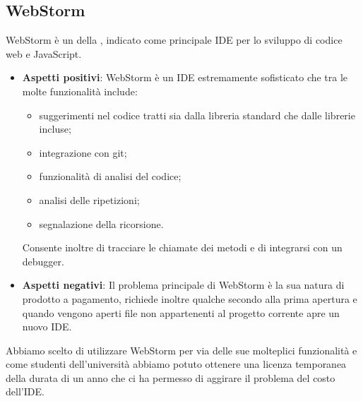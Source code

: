 \subsection{WebStorm}
WebStorm è un  della , indicato come principale IDE per lo sviluppo di codice web e JavaScript.
\begin{itemize}
	\item \textbf{Aspetti positivi}: WebStorm è un IDE estremamente sofisticato che tra le molte funzionalità include:
	\begin{itemize}
		\item suggerimenti nel codice tratti sia dalla libreria standard che dalle librerie incluse;
		\item integrazione con git;
		\item funzionalità di analisi del codice;
		\item analisi delle ripetizioni;
		\item segnalazione della ricorsione. 
	\end{itemize}
	Consente inoltre di tracciare le chiamate dei metodi e di integrarsi con un debugger.
	\item \textbf{Aspetti negativi}: Il problema principale di WebStorm è la sua natura di prodotto a pagamento, richiede inoltre qualche secondo alla prima apertura e quando vengono aperti file non appartenenti al progetto corrente apre un nuovo IDE.
\end{itemize}
Abbiamo scelto di utilizzare WebStorm per via delle sue molteplici funzionalità e come studenti dell'università abbiamo potuto ottenere una licenza temporanea della durata di un anno che ci ha permesso di aggirare il problema del costo dell'IDE.
